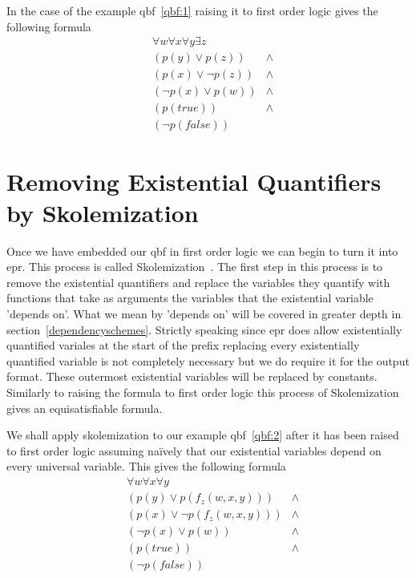 In the case of the example \gls{qbf}~\ref{qbf:1} raising it to first order logic gives the following formula
\begin{equation} \label{qbf:2}
\begin{aligned}
&\forall w \forall x \forall y \exists z\\
&(p(y) \lor p(z)) &\land\\
&(p(x) \lor \neg p(z)) &\land\\
&(\neg p(x) \lor p(w)) &\land\\
&(p(true)) &\land\\
&(\neg p(false))
\end{aligned}
\end{equation}

\section{Removing Existential Quantifiers by Skolemization} \label{skolemization}
Once we have embedded our \gls{qbf} in first order logic we can begin to turn it into \gls{epr}. This process is called Skolemization~\cite{skolemization}. The first step in this process is to remove the existential quantifiers and replace the variables they quantify with functions that take as arguments the variables that the existential variable 'depends on'. What we mean by 'depends on' will be covered in greater depth in section~\ref{dependencyschemes}. Strictly speaking since \gls{epr} does allow existentially quantified variales at the start of the prefix replacing every existentially quantified variable is not completely necessary but we do require it for the output format. These outermost existential variables will be replaced by constants. Similarly to raising the formula to first order logic this process of Skolemization gives an equisatisfiable formula.

We shall apply skolemization to our example \gls{qbf}~\ref{qbf:2} after it has been raised to first order logic assuming na{\"i}vely that our existential variables depend on every universal variable. This gives the following formula
\begin{equation} \label{qbf:3}
\begin{aligned}
&\forall w \forall x \forall y\\
&(p(y) \lor p(f_z(w, x, y))) &\land\\
&(p(x) \lor \neg p(f_z(w, x, y))) &\land\\
&(\neg p(x) \lor p(w)) &\land\\
&(p(true)) &\land\\
&(\neg p(false))
\end{aligned}
\end{equation}

